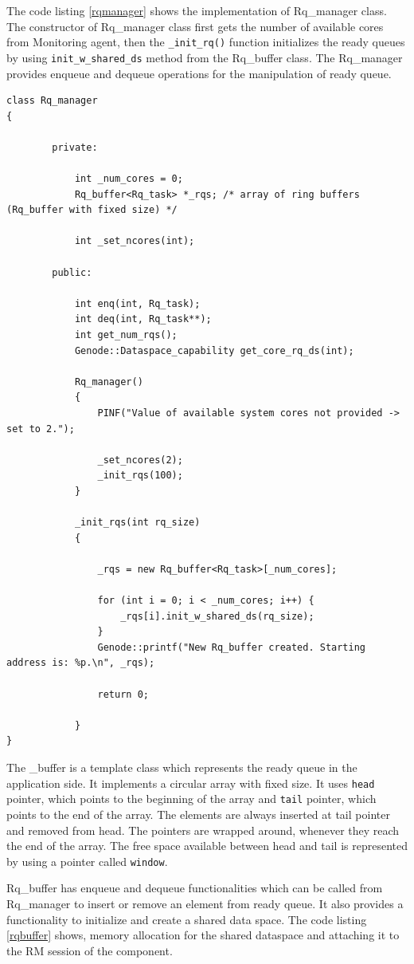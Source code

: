 The code listing \ref{rqmanager} shows the implementation of Rq\_manager class. The constructor of Rq\_manager class first gets the number of available cores from Monitoring agent, then the \texttt{\_init\_rq()} function initializes the ready queues by using \texttt{init\_w\_shared\_ds} method from the Rq\_buffer class. The Rq\_manager provides enqueue and dequeue operations for the manipulation of ready queue.

\begin{lstlisting}[caption={Rq\_manager class},label={rqmanager}, style=customcpp]
class Rq_manager
{	

		private:

			int _num_cores = 0;
			Rq_buffer<Rq_task> *_rqs; /* array of ring buffers (Rq_buffer with fixed size) */
			
			int _set_ncores(int);

		public:

			int enq(int, Rq_task);
			int deq(int, Rq_task**);
			int get_num_rqs();
			Genode::Dataspace_capability get_core_rq_ds(int);

			Rq_manager()
			{
				PINF("Value of available system cores not provided -> set to 2.");

				_set_ncores(2);
				_init_rqs(100);
			}

			_init_rqs(int rq_size)
			{

				_rqs = new Rq_buffer<Rq_task>[_num_cores];

				for (int i = 0; i < _num_cores; i++) {
					_rqs[i].init_w_shared_ds(rq_size);
				}
				Genode::printf("New Rq_buffer created. Starting address is: %p.\n", _rqs);

				return 0;

			}
}
\end{lstlisting}

The \_buffer is a template class which represents the ready queue in the application side. It implements a circular array with fixed size. It uses \texttt{head} pointer, which points to the beginning of the array and \texttt{tail} pointer, which points to the end of the array. The elements are always inserted at tail pointer and removed from head. The pointers are wrapped around, whenever they reach the end of the array. The free space available between head and tail is represented by using a pointer called \texttt{window}. 

Rq\_buffer has enqueue and dequeue functionalities which can be called from Rq\_manager to insert or remove an element from ready queue. It also provides a functionality to initialize and create a shared data space. The code listing \ref{rqbuffer} shows, memory allocation for the shared dataspace and attaching it to the RM session of the component.

